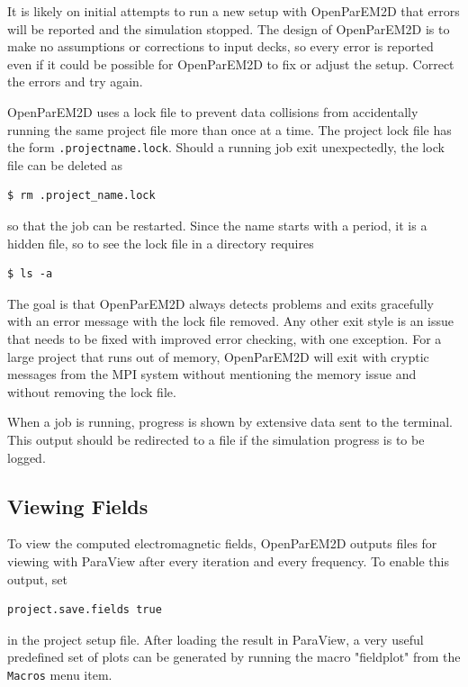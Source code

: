\documentclass[titlepage]{article}
\renewcommand\_{\textunderscore\linebreak[1]}
\begin{document}
It is likely on initial attempts to run a new setup with OpenParEM2D that errors will be reported and the simulation stopped.  The design of OpenParEM2D is to make no assumptions or corrections to input decks, so every error is reported even if it could be possible for OpenParEM2D to fix or adjust the setup.  Correct the errors and try again.

OpenParEM2D uses a lock file to prevent data collisions from accidentally running the same project file more than once at a time.  The project lock file has the form \texttt{.project\_name.lock}.  Should a running job exit unexpectedly, the lock file can be deleted as 
\begin{Verbatim}[fontsize=\small]
   $ rm .project_name.lock
\end{Verbatim}
\noindent so that the job can be restarted.  Since the name starts with a period, it is a hidden file, so to see the lock file in a directory requires
\begin{Verbatim}[fontsize=\small]
   $ ls -a
\end{Verbatim}

The goal is that OpenParEM2D always detects problems and exits gracefully with an error message with the lock file removed.  Any other exit style is an issue that needs to be fixed with improved error checking, with one exception.  For a large project that runs out of memory, OpenParEM2D will exit with cryptic messages from the MPI system without mentioning the memory issue and without removing the lock file.

When a job is running, progress is shown by extensive data sent to the terminal.  This output should be redirected to a file if the simulation progress is to be logged.

\subsection{Viewing Fields}

To view the computed electromagnetic fields, OpenParEM2D outputs files for viewing with ParaView after every iteration and every frequency.  To enable this output, set
\begin{Verbatim}[fontsize=\small]
  project.save.fields true
\end{Verbatim}
\noindent in the project setup file.  After loading the result in ParaView, a very useful predefined set of plots can be generated by running the macro "field\_plot" from the \texttt{Macros} menu item.
\end{document}
